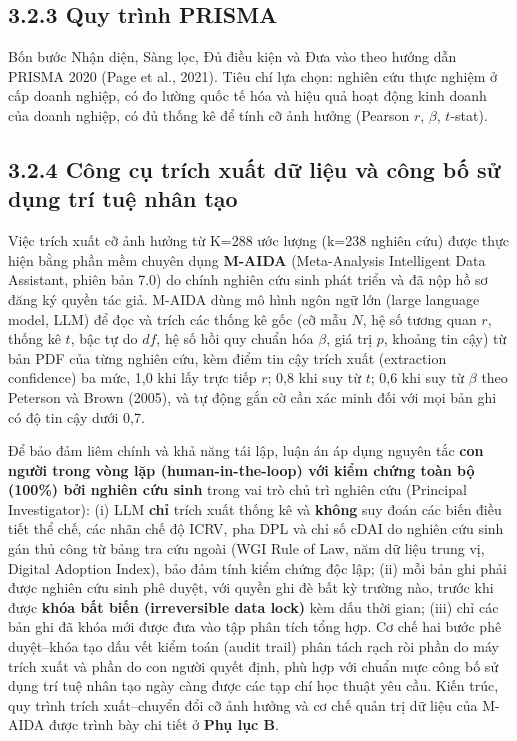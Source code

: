 \documentclass[
  a4paper,
  13pt]{extreport}
\begin{document}
\hypertarget{quy-truxecnh-prisma}{%
\subsection{3.2.3 Quy trình PRISMA}\label{quy-truxecnh-prisma}}

Bốn bước Nhận diện, Sàng lọc, Đủ điều kiện và Đưa vào theo hướng dẫn
PRISMA 2020 (Page et al., 2021). Tiêu chí lựa chọn: nghiên cứu thực
nghiệm ở cấp doanh nghiệp, có đo lường quốc tế hóa và hiệu quả hoạt động
kinh doanh của doanh nghiệp, có đủ thống kê để tính cỡ ảnh hưởng
(Pearson \(r\), \(\beta\), \(t\)-stat).

\hypertarget{cuxf4ng-cux1ee5-truxedch-xuux1ea5t-dux1eef-liux1ec7u-vuxe0-cuxf4ng-bux1ed1-sux1eed-dux1ee5ng-truxed-tuux1ec7-nhuxe2n-tux1ea1o}{%
\subsection{3.2.4 Công cụ trích xuất dữ liệu và công bố sử dụng trí tuệ
nhân
tạo}\label{cuxf4ng-cux1ee5-truxedch-xuux1ea5t-dux1eef-liux1ec7u-vuxe0-cuxf4ng-bux1ed1-sux1eed-dux1ee5ng-truxed-tuux1ec7-nhuxe2n-tux1ea1o}}

Việc trích xuất cỡ ảnh hưởng từ K=288 ước lượng (k=238 nghiên cứu) được
thực hiện bằng phần mềm chuyên dụng \textbf{M-AIDA} (Meta-Analysis
Intelligent Data Assistant, phiên bản 7.0) do chính nghiên cứu sinh phát
triển và đã nộp hồ sơ đăng ký quyền tác giả. M-AIDA dùng mô hình ngôn
ngữ lớn (large language model, LLM) để đọc và trích các thống kê gốc (cỡ
mẫu \(N\), hệ số tương quan \(r\), thống kê \(t\), bậc tự do \(df\), hệ
số hồi quy chuẩn hóa \(\beta\), giá trị \(p\), khoảng tin cậy) từ bản
PDF của từng nghiên cứu, kèm điểm tin cậy trích xuất (extraction
confidence) ba mức, 1,0 khi lấy trực tiếp \(r\); 0,8 khi suy từ \(t\);
0,6 khi suy từ \(\beta\) theo Peterson và Brown (2005), và tự động gắn
cờ cần xác minh đối với mọi bản ghi có độ tin cậy dưới 0,7.

Để bảo đảm liêm chính và khả năng tái lập, luận án áp dụng nguyên tắc
\textbf{con người trong vòng lặp (human-in-the-loop) với kiểm chứng toàn
bộ (100\%) bởi nghiên cứu sinh} trong vai trò chủ trì nghiên cứu
(Principal Investigator): (i) LLM \textbf{chỉ} trích xuất thống kê và
\textbf{không} suy đoán các biến điều tiết thể chế, các nhãn chế độ
ICRV, pha DPL và chỉ số cDAI do nghiên cứu sinh gán thủ công từ bảng tra
cứu ngoài (WGI Rule of Law, năm dữ liệu trung vị, Digital Adoption
Index), bảo đảm tính kiểm chứng độc lập; (ii) mỗi bản ghi phải được
nghiên cứu sinh phê duyệt, với quyền ghi đè bất kỳ trường nào, trước khi
được \textbf{khóa bất biến (irreversible data lock)} kèm dấu thời gian;
(iii) chỉ các bản ghi đã khóa mới được đưa vào tập phân tích tổng hợp.
Cơ chế hai bước phê duyệt--khóa tạo dấu vết kiểm toán (audit trail) phân
tách rạch ròi phần do máy trích xuất và phần do con người quyết định,
phù hợp với chuẩn mực công bố sử dụng trí tuệ nhân tạo ngày càng được
các tạp chí học thuật yêu cầu. Kiến trúc, quy trình trích xuất--chuyển
đổi cỡ ảnh hưởng và cơ chế quản trị dữ liệu của M-AIDA được trình bày
chi tiết ở \textbf{Phụ lục B}.
\end{document}

